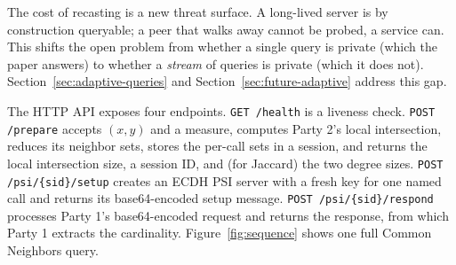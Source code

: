 \documentclass[sigconf]{acmart}
\begin{document}
The cost of recasting is a new threat surface. A long-lived server is by construction queryable; a peer that walks away cannot be probed, a service can. This shifts the open problem from whether a single query is private (which the paper answers) to whether a \emph{stream} of queries is private (which it does not). Section~\ref{sec:adaptive-queries} and Section~\ref{sec:future-adaptive} address this gap.

The HTTP API exposes four endpoints. \texttt{GET /health} is a liveness check. \texttt{POST /prepare} accepts $(x, y)$ and a measure, computes Party 2's local intersection, reduces its neighbor sets, stores the per-call sets in a session, and returns the local intersection size, a session ID, and (for Jaccard) the two degree sizes. \texttt{POST /psi/\{sid\}/setup} creates an ECDH PSI server with a fresh key for one named call and returns its base64-encoded setup message. \texttt{POST /psi/\{sid\}/respond} processes Party 1's base64-encoded request and returns the response, from which Party 1 extracts the cardinality. Figure~\ref{fig:sequence} shows one full Common Neighbors query.
\end{document}
